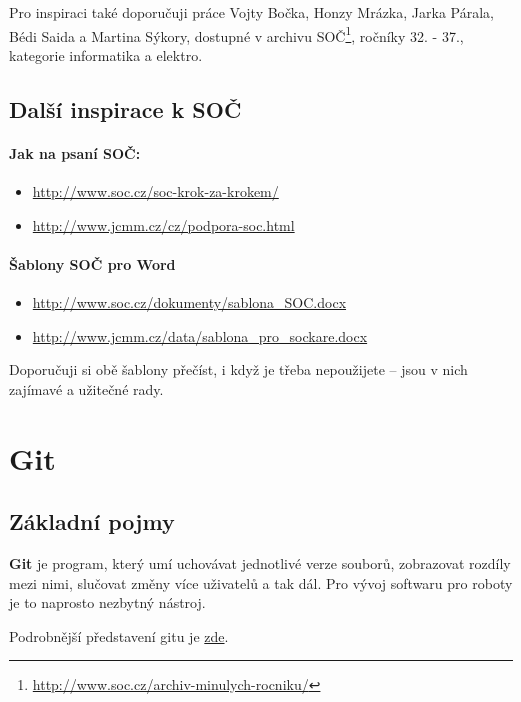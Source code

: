 Pro inspiraci také doporučuji práce Vojty Bočka, Honzy Mrázka, Jarka Párala, Bédi Saida a Martina Sýkory, dostupné v archivu SOČ\footnote{\url{http://www.soc.cz/archiv-minulych-rocniku/}}, ročníky 32. - 37., kategorie informatika a elektro.

\subsection{Další inspirace k SOČ}

	 \paragraph{Jak na psaní SOČ:}
		\begin{itemize}
			\item \url{http://www.soc.cz/soc-krok-za-krokem/}
			\item \url{http://www.jcmm.cz/cz/podpora-soc.html}		
		\end{itemize}

	\paragraph{Šablony SOČ pro Word}
	\begin{itemize}
		\item \url{http://www.soc.cz/dokumenty/sablona_SOC.docx}
		\item \url{http://www.jcmm.cz/data/sablona_pro_sockare.docx}
	\end{itemize}

Doporučuji si obě šablony přečíst, i když je třeba nepoužijete -- jsou v nich zajímavé a užitečné rady.

\section{Git} 


\subsection{Základní pojmy}


{\bf Git} je program, který umí uchovávat jednotlivé verze souborů, zobrazovat rozdíly mezi nimi, slučovat změny více uživatelů a tak dál. Pro vývoj softwaru pro roboty je to naprosto nezbytný nástroj. 

Podrobnější představení gitu je  \href{http://www.kutac.cz/blog/pocitace-a-internety/jak-na-git-dil-0-co-proc-jak/}{zde}.

